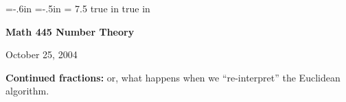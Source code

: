 \def\cmb{\MidnightBlue}	  %
\def\cnb{\NavyBlue}	  %
\def\crb{\RoyalBlue}	  %
\def\cce{\Cerulean}	  %
\def\ccy{\Cyan}		  %
\def\cpb{\ProcessBlue}	  %
\def\csb{\SkyBlue}	  %
\def\ctu{\Turquoise}	  %
\def\ctb{\TealBlue}	  %
\def\caq{\Aquamarine}	  %
\def\cbg{\BlueGreen}	  %
\def\cem{\Emerald}	  %
\def\cjg{\JungleGreen}	  %
\def\csg{\SeaGreen}	  %
\def\cgg{\Green}	  %
\def\cfg{\ForestGreen}	  %
\def\cpg{\PineGreen}	  %
\def\clg{\LimeGreen}	  %
\def\cyg{\YellowGreen}	  %
\def\cspg{\SpringGreen}	  %
\def\cog{\OliveGreen}	  %
\def\pars{\RawSienna}	  %
\def\cse{\Sepia}		  %
\def\cbr{\Brown}		  %
\def\cta{\Tan}		  %
\def\cgr{\Gray}		  %
\def\cbl{\Black}		  %
\def\cwh{\White}		  %


\voffset=-.6in
\hoffset=-.5in
\hsize = 7.5 true in
 true in


\overfullrule=0pt


\def\ctln{\centerline}
\def\u{\underbar}
\def\ssk{\smallskip}
\def\msk{\medskip}
\def\bsk{\bigskip}
\def\hsk{\hskip.1in}
\def\hhsk{\hskip.2in}

\def\lra{$\Leftrightarrow$ }


\ctln{\bf Math 445 Number Theory}

\smallskip

\ctln{October 25, 2004}

\medskip

{\bf Continued fractions:} or, what happens when we ``re-interpret'' the Euclidean algorithm.

